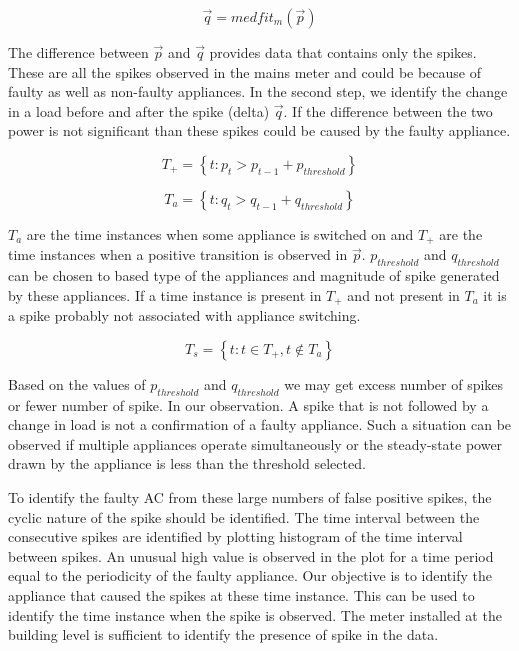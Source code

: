 $$ \vec{q} = medfit_m(\vec{p}) $$

The difference between $\vec{p}$ and $\vec{q}$ provides data that contains only the spikes. These are all the spikes observed in the mains meter and could be because of faulty as well as non-faulty appliances. In the second step, we identify the change in a load before and after the spike (delta) $\vec{q}$. If the difference between the two power is not significant than these spikes could be caused by the faulty appliance. 

$$T_+ = \left \{ t :  p_t >  p_{t-1} + p_{threshold}   \right \}$$

$$T_a = \left \{ t :  q_t >  q_{t-1} + q_{threshold}  \right \}$$

$T_a$ are the time instances when some appliance is switched on and $T_+$ are the time instances when a positive transition is observed in $\vec{p}$. $p_{threshold}$ and $q_{threshold}$ can be chosen to based type of the appliances and magnitude of spike generated by these appliances. If a time instance is present in $T_+$ and not present in $T_a$ it is a spike probably not associated with appliance switching.

$$ T_s = \left \{ t :  t \in T_+,  t \notin T_a \right \} $$  

Based on the values of $p_{threshold}$ and $q_{threshold}$ we may get excess number of spikes or fewer number of spike. In our observation. A spike that is not followed by a change in load is not a confirmation of a faulty appliance. Such a situation can be observed if multiple appliances operate simultaneously or the steady-state power drawn by the appliance is less than the threshold selected.

To identify the faulty AC from these large numbers of false positive spikes, the cyclic nature of the spike should be identified. The time interval between the consecutive spikes are identified by plotting histogram of the time interval between spikes. An unusual high value is observed in the plot for a time period equal to the periodicity of the faulty appliance. Our objective is to identify the appliance that caused the spikes at these time instance. This can be used to identify the time instance when the spike is observed. The meter installed at the building level is sufficient to identify the presence of spike in the data. 
